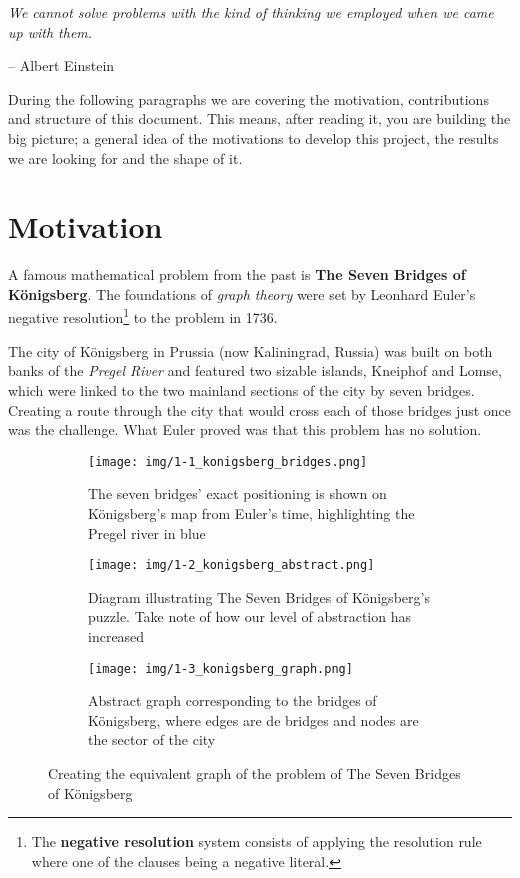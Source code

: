 \epigraph{\textit{We cannot solve problems with the kind of thinking we employed when we came up with them.}}{-- \textup{Albert Einstein}}

During the following paragraphs we are covering the motivation, contributions and structure of this document. This means, after reading it, you are building the big picture; a general idea of the motivations to develop this project, the results we are looking for and the shape of it.

\section{Motivation}

A famous mathematical problem from the past is \textbf{The Seven Bridges of Königsberg}. The foundations of \textit{graph theory} were set by Leonhard Euler's negative resolution\footnote{The \textbf{negative resolution} system consists of applying the resolution rule where one of the clauses being a negative literal.} to the problem in 1736.

The city of Königsberg in Prussia (now Kaliningrad, Russia) was built on both banks of the \textit{Pregel River} and featured two sizable islands, Kneiphof and Lomse, which were linked to the two mainland sections of the city by seven bridges. Creating a route through the city that would cross each of those bridges just once was the challenge. What Euler proved was that this problem has no solution.

\begin{figure}[ht]
    \begin{subfigure}{.3\textwidth}
        \centering
        \texttt{[image: img/1-1\_konigsberg\_bridges.png]}
        \caption{The seven bridges' exact positioning is shown on Königsberg's map from Euler's time, highlighting the Pregel river in blue}
    \end{subfigure}%
    \hspace*{0.5em}
    \begin{subfigure}{.3\textwidth}
        \centering
        \texttt{[image: img/1-2\_konigsberg\_abstract.png]}
        \caption{Diagram illustrating The Seven Bridges of Königsberg's puzzle. Take note of how our level of abstraction has increased}
    \end{subfigure}%
    \hspace*{0.5em}
    \begin{subfigure}{.3\textwidth}
        \centering
        \texttt{[image: img/1-3\_konigsberg\_graph.png]}
        \caption{Abstract graph corresponding to the bridges of Königsberg, where edges are de bridges and nodes are the sector of the city}
    \end{subfigure}%
    \caption[Creating the equivalent graph of the problem of The Seven Bridges of Königsberg]{Creating the equivalent graph of the problem of The Seven Bridges of Königsberg\footnotemark}
\end{figure}

